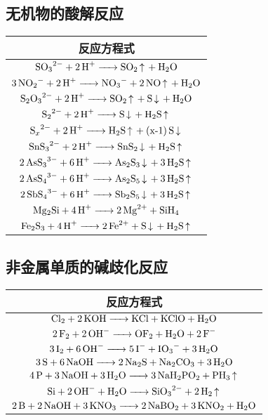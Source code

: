 \documentclass[
  10pt,
  twoside,
  openany,
  b5paper, %
  colorscheme = basic, %
  xits = false,
]{qyxf-book}
\begin{document}
\subsection{无机物的酸解反应}

\begin{table}[htbp]
	\centering
	\begin{tabular}{c}
	\toprule
		反应方程式  \\
	\midrule
		\qquad \qquad $\ce{SO3^2- + 2H+ -> SO2 ^ + H2O}$ \qquad\qquad \\
		\qquad\qquad $\ce{3NO_2- + 2H+ -> NO3^- + 2NO ^ + H2O}$ \qquad\qquad\\
		\qquad\qquad $\ce{S2O3^2- + 2H+ -> SO2 ^ + S v + H2O}$ \qquad\qquad \\  \qquad\qquad $\ce{S2^2- + 2H+ -> S v + H2S ^}$ \qquad\qquad \\
		\qquad\qquad $\ce{S_x^2- + 2H+ -> H2S ^ + (x-1)S v }$\qquad\qquad \\  \qquad\qquad$\ce{SnS3^2- + 2H+ -> SnS2 v + H2S ^}$ \qquad\qquad \\
		\qquad\qquad $\ce{2AsS3^3- + 6H+ -> As2S3 v + 3H2S ^ }$ \qquad\qquad \\   \qquad\qquad $\ce{2AsS4^3- + 6H+ -> As2S5 v + 3H2S ^}$ \qquad\qquad \\
		\qquad\qquad $\ce{2SbS4^3- + 6H+ -> Sb2S5 v + 3H2S ^}$\qquad\qquad\\
		\qquad\qquad $\ce{Mg2Si + 4H+ -> 2Mg^2+ + SiH4}$ \qquad\qquad \\
		\qquad\qquad $\ce{Fe2S3 + 4H+ -> 2Fe^2+ + S v + H2S ^}$\qquad\qquad\\
	\bottomrule
	\end{tabular}
\end{table}

\subsection{非金属单质的碱歧化反应}
\begin{table}[htbp]
	\centering
	\begin{tabular}{c}
		\toprule
		反应方程式  \\
		\midrule
		\qquad \qquad $\ce{Cl2 + 2KOH -> KCl + KClO + H2O}$ \qquad\qquad \\
		\qquad\qquad $\ce{2F2 + 2OH- -> OF2 + H2O + 2F-}$ \qquad\qquad\\
		\qquad\qquad $\ce{3I2 + 6OH- -> 5I- + IO3^- + 3H2O}$ \qquad\qquad \\  \qquad\qquad $\ce{3S + 6NaOH -> 2Na2S + Na2CO3 + 3H2O}$ \qquad\qquad \\
		\qquad\qquad $\ce{4P + 3NaOH + 3H2O -> 3NaH2PO2 + PH3 ^}$\qquad\qquad \\  \qquad\qquad$\ce{Si + 2OH- + H2O -> SiO3^2- + 2H2 ^}$ \qquad\qquad \\
		\qquad\qquad $\ce{2B + 2NaOH + 3KNO3 -> 2NaBO2 + 3KNO2 + H2O}$ \qquad\qquad \\   
		\bottomrule
	\end{tabular}
\end{table}
\end{document}
